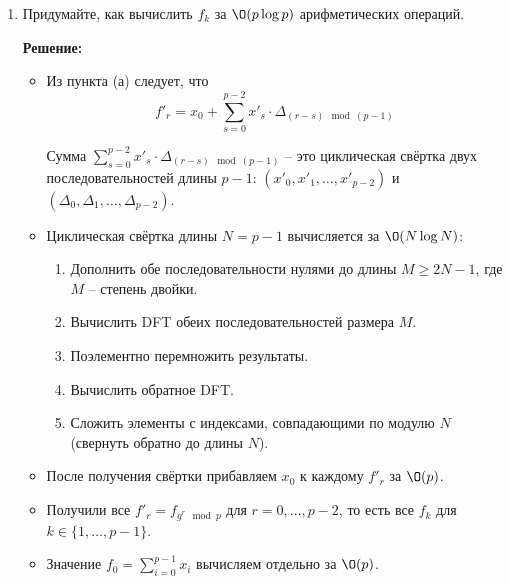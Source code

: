 \begin{enumerate}
\begin{enumerate}
\begin{itemize}
          \item Значит:
          $$\omega_p^{g^r \cdot g^{-s} \mod p} = \omega_p^{g^{(r-s) \mod (p-1)}} = \Delta_{(r-s) \mod (p-1)}$$

          \item Подставляя $x'_s = x_{g^{-s} \mod p}$:
          $$f'_r = x_0 + \sum_{s=0}^{p-2} x'_s \cdot \Delta_{(r-s) \mod (p-1)}$$

          ч.т.д.
        \end{itemize}

      \item
        Придумайте, как вычислить $f_k$ за $\O(p \log{p})$ арифметических операций.

        \textbf{Решение:}

        \begin{itemize}
          \item Из пункта (а) следует, что
          $$f'_r = x_0 + \sum_{s=0}^{p-2} x'_s \cdot \Delta_{(r-s) \mod (p-1)}$$

          Сумма $\sum_{s=0}^{p-2} x'_s \cdot \Delta_{(r-s) \mod (p-1)}$ -- это циклическая свёртка двух последовательностей длины $p - 1$: $(x'_0, x'_1, \ldots, x'_{p-2})$ и $(\Delta_0, \Delta_1, \ldots, \Delta_{p-2})$.

          \item Циклическая свёртка длины $N = p - 1$ вычисляется за $\O(N \log N)$:
          \begin{enumerate}
            \item Дополнить обе последовательности нулями до длины $M \geq 2N - 1$, где $M$ -- степень двойки.
            \item Вычислить DFT обеих последовательностей размера $M$.
            \item Поэлементно перемножить результаты.
            \item Вычислить обратное DFT.
            \item Сложить элементы с индексами, совпадающими по модулю $N$ (свернуть обратно до длины $N$).
          \end{enumerate}

          \item После получения свёртки прибавляем $x_0$ к каждому $f'_r$ за $\O(p)$.

          \item Получили все $f'_r = f_{g^r \mod p}$ для $r = 0, \ldots, p-2$, то есть все $f_k$ для $k \in \{1, \ldots, p-1\}$.

          \item Значение $f_0 = \sum_{i=0}^{p-1} x_i$ вычисляем отдельно за $\O(p)$.


\end{itemize}
\end{enumerate}
\end{enumerate}
